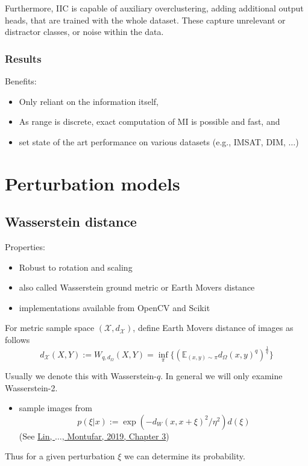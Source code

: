 \documentclass[]{article}
\begin{document}
Furthermore, IIC is capable of auxiliary overclustering, adding additional output heads, that are trained with the whole dataset. These capture unrelevant or distractor classes, or noise within the data.\\

\subsubsection{Results}
Benefits:
\begin{itemize}
	\item Only reliant on the information itself,
	\item As range is discrete, exact computation of MI is possible and fast, and 
	\item set state of the art performance on various datasets (e.g., IMSAT, DIM, $\dots$)
\end{itemize}

\section{Perturbation models}
\subsection{Wasserstein distance}

Properties:
\begin{itemize}
	\item Robust to rotation and scaling
	\item also called Wasserstein ground metric or Earth Movers distance
	\item implementations available from OpenCV and Scikit
\end{itemize}

For metric sample space $(\mathcal{X},d_\mathcal{X})$, define Earth Movers distance of images as follows\\

\begin{equation}
	d_\mathcal{X}(X,Y):= W_{q,d_\Omega}(X,Y) = \inf_\pi \{ (\mathbb{E}_{(x,y)\sim \pi}d_\Omega (x,y)^q)^{\frac{1}{q}} \}
\end{equation} 

Usually we denote this with Wasserstein-$q$. In general we will only examine Wasserstein-2.

\begin{itemize}
	\item sample images from 
	\begin{equation}
		p(\xi|x):= \exp(-d_W(x,x+\xi)^2/\eta^2)d(\xi)
	\end{equation}(See \href{https://arxiv.org/pdf/1909.06860.pdf}{Lin, $\dots$, Montufar, 2019, Chapter 3})
\end{itemize}
Thus for a given perturbation $\xi$ we can determine its probability. 
\end{document}
